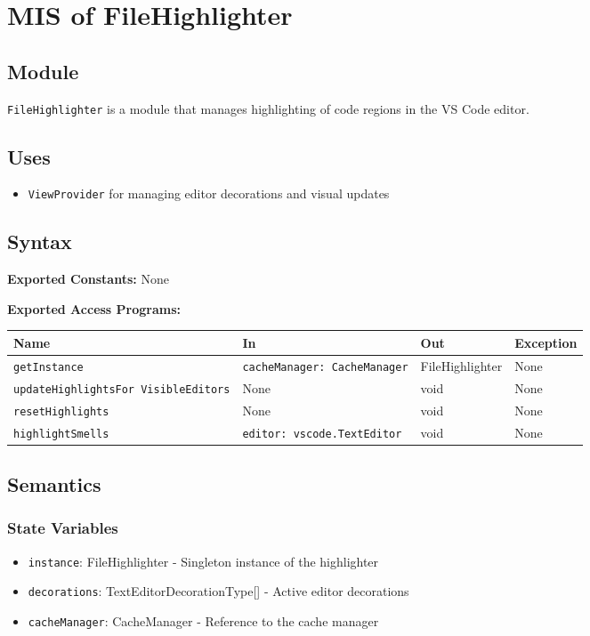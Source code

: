 \documentclass[12pt, titlepage]{article}
\begin{document}
\section{MIS of FileHighlighter}

\subsection{Module}
\texttt{FileHighlighter} is a module that manages highlighting of code regions in the VS Code editor.

\subsection{Uses}
\begin{itemize}
\item \texttt{ViewProvider} for managing editor decorations and visual updates
\end{itemize}

\subsection{Syntax}

\textbf{Exported Constants:} None

\noindent \textbf{Exported Access Programs:}\\
\begin{tabularx}{\linewidth}{|p{5cm}|>{\raggedright\arraybackslash}X|l|l|}
  \hline
  \textbf{Name} & \textbf{In} & \textbf{Out} & \textbf{Exception} \\
  \hline
  \texttt{getInstance} & \texttt{cacheManager: CacheManager} & FileHighlighter & None \\ \hline
  \texttt{updateHighlightsFor \allowbreak VisibleEditors} & None & void & None \\ \hline
  \texttt{resetHighlights} & None & void & None \\ \hline
  \texttt{highlightSmells} & \texttt{editor: vscode.TextEditor} & void & None \\
  \hline
\end{tabularx}

\subsection{Semantics}

\subsubsection{State Variables}
\begin{itemize}
\item \texttt{instance}: FileHighlighter - Singleton instance of the highlighter
\item \texttt{decorations}: TextEditorDecorationType[] - Active editor decorations
\item \texttt{cacheManager}:  CacheManager - Reference to the cache manager
\end{itemize}
\end{document}

